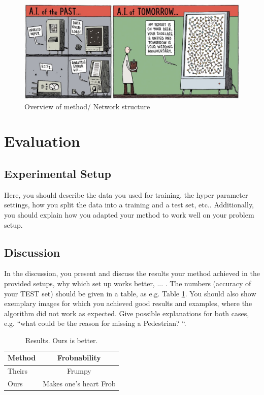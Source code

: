 \documentclass[10pt,twocolumn,letterpaper]{article}
\begin{document}
\begin{figure}[t]
	\begin{center}
		\includegraphics[width=1.0\linewidth]{AI-comic-funny.jpg}
	\end{center}
	\caption{Overview of method/ Network structure}
	\label{fig:long}
\end{figure}

\section{Evaluation}
\subsection{Experimental Setup}
Here, you should describe the data you used for training, the hyper parameter settings, how you split the data into a training and a test set, etc.. Additionally, you should explain how you adapted your method to work well on your problem setup.




\subsection{Discussion}
In the discussion, you present and discuss the results your method achieved in the provided setups, why which set up works better, ... . The numbers (accuracy of your TEST set) should be given in a table, as e.g. Table \ref{tab:results}. You should also show exemplary images for which you achieved good results and examples, where the algorithm did not work as expected. Give possible explanations for both cases, e.g. ``what could be the reason for missing a Pedestrian? ``.

\begin{table}
	\begin{center}
		\begin{tabular}{|l|c|}
			\hline
			Method & Frobnability \\
			\hline\hline
			Theirs & Frumpy \\
			Ours & Makes one's heart Frob\\
			\hline
		\end{tabular}
	\end{center}
	\caption{Results. Ours is better.}
	\label{tab:results}
\end{table}
\end{document}
